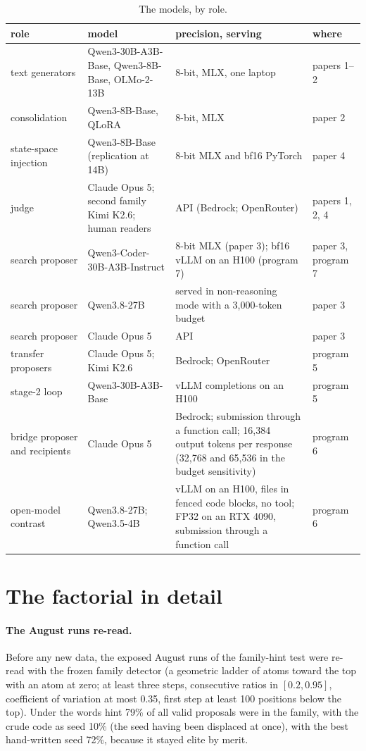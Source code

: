 \documentclass[11pt]{article}
\begin{document}
\begin{table}[!htbp]
\centering\footnotesize
\setlength{\tabcolsep}{3pt}
\begin{tabular}{R{2.6cm} R{4.6cm} R{4.6cm} R{3.0cm}}
\toprule
role & model & precision, serving & where \\
\midrule
text generators & Qwen3-30B-A3B-Base, Qwen3-8B-Base, OLMo-2-13B & 8-bit, MLX, one laptop & papers 1--2 \\
consolidation & Qwen3-8B-Base, QLoRA & 8-bit, MLX & paper 2 \\
state-space injection & Qwen3-8B-Base (replication at 14B) & 8-bit MLX and bf16 PyTorch & paper 4 \\
judge & Claude Opus 5; second family Kimi K2.6; human readers & API (Bedrock; OpenRouter) & papers 1, 2, 4 \\
search proposer & Qwen3-Coder-30B-A3B-Instruct & 8-bit MLX (paper 3); bf16 vLLM on an H100 (program 7) & paper 3, program 7 \\
search proposer & Qwen3.8-27B & served in non-reasoning mode with a 3{,}000-token budget & paper 3 \\
search proposer & Claude Opus 5 & API & paper 3 \\
transfer proposers & Claude Opus 5; Kimi K2.6 & Bedrock; OpenRouter & program 5 \\
stage-2 loop & Qwen3-30B-A3B-Base & vLLM completions on an H100 & program 5 \\
bridge proposer and recipients & Claude Opus 5 & Bedrock; submission through a function call; 16{,}384 output tokens per response (32{,}768 and 65{,}536 in the budget sensitivity) & program 6 \\
open-model contrast & Qwen3.8-27B; Qwen3.5-4B & vLLM on an H100, files in fenced code blocks, no tool; FP32 on an RTX 4090, submission through a function call & program 6 \\
\bottomrule
\end{tabular}
\caption{The models, by role.}
\label{tab:models}
\end{table}

\section{The factorial in detail}
\label{app:factorial}

\paragraph{The August runs re-read.} Before any new data, the exposed
August runs of the family-hint test were re-read with the frozen family
detector (a geometric ladder of atoms toward the top with an atom at zero;
at least three steps, consecutive ratios in $[0.2, 0.95]$, coefficient of
variation at most 0.35, first step at least 100 positions below the top).
Under the words hint 79\% of all valid proposals were in the family, with
the crude code as seed 10\% (the seed having been displaced at once), with
the best hand-written seed 72\%, because it stayed elite by merit.
\end{document}
